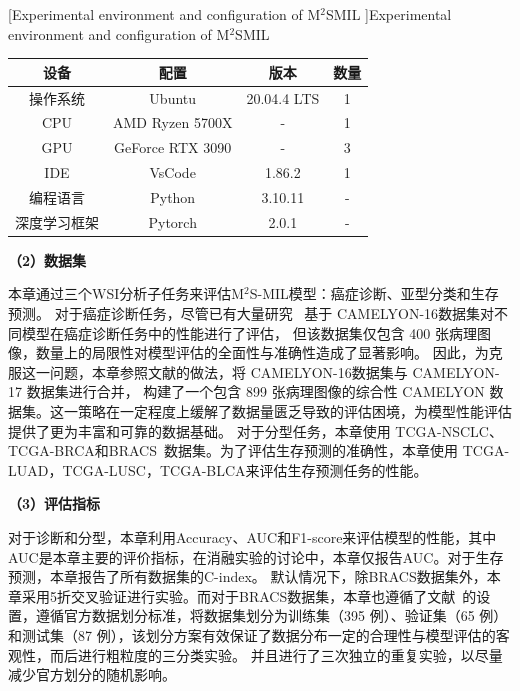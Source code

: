\begin{table}[h!]
  \small    %
  \centering
  [Experimental environment and configuration of M$^2$SMIL ]{Experimental environment and configuration of M$^2$SMIL}
  \begin{tabularx}{\textwidth}{CcCC}
  \toprule
  设备     & 配置               & 版本          & 数量 \\ 
  \midrule
  操作系统   & Ubuntu           & 20.04.4 LTS & 1  \\
  CPU    & AMD Ryzen 5700X  & -           & 1  \\
  GPU    & GeForce RTX 3090 & -           & 3  \\
  IDE    & VsCode           & 1.86.2      & 1  \\
  编程语言   & Python           & 3.10.11       & -  \\
  深度学习框架 & Pytorch          & 2.0.1       & -  \\
  \bottomrule
  \end{tabularx}
  \label{table3: env}
  \end{table}

\textbf{（2）数据集}

本章通过三个WSI分析子任务来评估M$^2$S-MIL模型：癌症诊断、亚型分类和生存预测。
对于癌症诊断任务，尽管已有大量研究~\cite{li2021dual,shao2021transmil,tang2023multiple} 基于 CAMELYON-16\cite{bejnordi2017diagnostic}数据集对不同模型在癌症诊断任务中的性能进行了评估，
但该数据集仅包含 400 张病理图像，数量上的局限性对模型评估的全面性与准确性造成了显著影响。
因此，为克服这一问题，本章参照文献\cite{lu2021data,tang2024feature}的做法，将 CAMELYON-16\cite{bejnordi2017diagnostic}数据集与 CAMELYON-17\cite{bandi2018detection} 数据集进行合并，
构建了一个包含 899 张病理图像的综合性 CAMELYON 数据集。这一策略在一定程度上缓解了数据量匮乏导致的评估困境，为模型性能评估提供了更为丰富和可靠的数据基础。
对于分型任务，本章使用 TCGA-NSCLC、TCGA-BRCA和BRACS~\cite{brancati2022bracs}数据集。为了评估生存预测的准确性，本章使用 TCGA-LUAD，TCGA-LUSC，TCGA-BLCA来评估生存预测任务的性能。

\textbf{（3）评估指标}

对于诊断和分型，本章利用Accuracy、AUC和F1-score来评估模型的性能，其中AUC是本章主要的评价指标，在消融实验的讨论中，本章仅报告AUC。对于生存预测，本章报告了所有数据集的C-index。
默认情况下，除BRACS数据集外，本章采用5折交叉验证进行实验。而对于BRACS数据集，本章也遵循了文献~\cite{chen2024towards}的设置，遵循官方数据划分标准，将数据集划分为训练集（395 例）、验证集（65 例）和测试集（87 例），该划分方案有效保证了数据分布一定的合理性与模型评估的客观性，而后进行粗粒度的三分类实验。
并且进行了三次独立的重复实验，以尽量减少官方划分的随机影响。%

